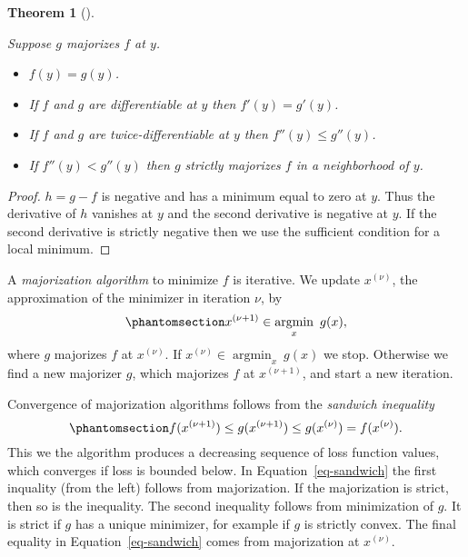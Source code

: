 \documentclass[
  12pt,
  letterpaper,
  DIV=11,
  numbers=noendperiod]{scrartcl}
\providecommand{\tightlist}{%
  \setlength{\itemsep}{0pt}\setlength{\parskip}{0pt}}\usepackage{longtable,booktabs,array}
\theoremstyle{definition}
\theoremstyle{definition}
\theoremstyle{plain}
\theoremstyle{plain}
\newtheorem{theorem}{Theorem}[section]
\theoremstyle{plain}
\theoremstyle{remark}
\begin{document}
\begin{theorem}[]\protect\hypertarget{thm-diff}{}\label{thm-diff}

Suppose \(g\) majorizes \(f\) at \(y\).

\begin{itemize}
\tightlist
\item
  \(f(y)=g(y)\).
\item
  If \(f\) and \(g\) are differentiable at \(y\) then \(f'(y)=g'(y)\).
\item
  If \(f\) and \(g\) are twice-differentiable at \(y\) then
  \(f''(y)\leq g''(y)\).
\item
  If \(f''(y)<g''(y)\) then \(g\) strictly majorizes \(f\) in a
  neighborhood of \(y\).
\end{itemize}

\end{theorem}

\begin{proof}
\(h=g-f\) is negative and has a minimum equal to zero at \(y\). Thus the
derivative of \(h\) vanishes at \(y\) and the second derivative is
negative at \(y\). If the second derivative is strictly negative then we
use the sufficient condition for a local minimum.
\end{proof}

A \emph{majorization algorithm} to minimize \(f\) is iterative. We
update \(x^{(\nu)}\), the approximation of the minimizer in iteration
\(\nu\), by \begin{equation}\phantomsection\label{eq-majmaj}{
x^{(\nu+1)}\in\mathop{\text{argmin}}_x\ g(x),
}\end{equation} where \(g\) majorizes \(f\) at \(x^{(\nu)}\). If
\(x^{(\nu)}\in\mathop{\text{argmin}}_x\ g(x)\) we stop. Otherwise we
find a new majorizer \(g\), which majorizes \(f\) at \(x^{(\nu+1)}\),
and start a new iteration.

Convergence of majorization algorithms follows from the \emph{sandwich
inequality} \begin{equation}\phantomsection\label{eq-sandwich}{
f(x^{(\nu+1)})\leq g(x^{(\nu+1)})\leq g(x^{(\nu)})=f(x^{(\nu)}).
}\end{equation} This we the algorithm produces a decreasing sequence of
loss function values, which converges if loss is bounded below. In
Equation~\ref{eq-sandwich} the first inquality (from the left) follows
from majorization. If the majorization is strict, then so is the
inequality. The second inequality follows from minimization of \(g\). It
is strict if \(g\) has a unique minimizer, for example if \(g\) is
strictly convex. The final equality in Equation~\ref{eq-sandwich} comes
from majorization at \(x^{(\nu)}\).
\end{document}
